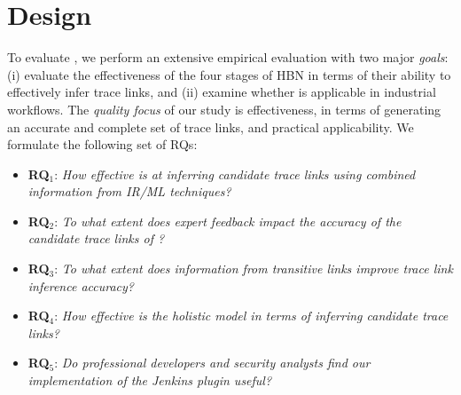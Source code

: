 \section{Design}
\label{sec:design-hbn}

To evaluate \Comet, we perform an extensive empirical evaluation with two major \textit{goals}: (i) evaluate the effectiveness of the four stages of \Comets HBN in terms of their ability to effectively infer trace links, and (ii) examine whether \Comet is applicable in industrial workflows. The \textit{quality focus} of our study is \Comets effectiveness, in terms of generating an accurate and complete set of trace links, and practical applicability. We formulate the following set of RQs:

\begin{itemize}

	\item{\textbf{RQ$_1$}: \textit{How effective is \Comet at inferring candidate trace links using combined information from IR/ML techniques?}}

	\item{\textbf{RQ$_2$}: \textit{To what extent does expert feedback impact the accuracy of the candidate trace links of \Comet?}}

	\item{\textbf{RQ$_3$}: \textit{To what extent does information from transitive links improve \Comets trace link inference accuracy?}}

	\item{\textbf{RQ$_4$}: \textit{How effective is the holistic \Comet model in terms of inferring candidate trace links?}}

	\item{\textbf{RQ$_5$}: \textit{Do professional developers and security analysts find our implementation of the \Comet Jenkins plugin useful?}}
	
\end{itemize}




